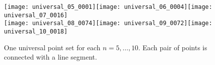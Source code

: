 \documentclass[11pt]{article}
\begin{document}
\begin{figure}[htbp]
  \centering \newcommand{\thisfigwidth}{0.3\textwidth}\texttt{[image: universal\_05\_0001]}\hfil \texttt{[image: universal\_06\_0004]}\hfil \texttt{[image: universal\_07\_0016]}\\[\baselineskip]
  \texttt{[image: universal\_08\_0074]}\hfil \texttt{[image: universal\_09\_0072]}\hfil \texttt{[image: universal\_10\_0018]}
  \caption{One universal point set for each $n=5,\dots,10$. Each pair of points
    is connected with a line segment.}
  \label{fig:universal_5_10}
\end{figure}

\newpage

\end{document}
